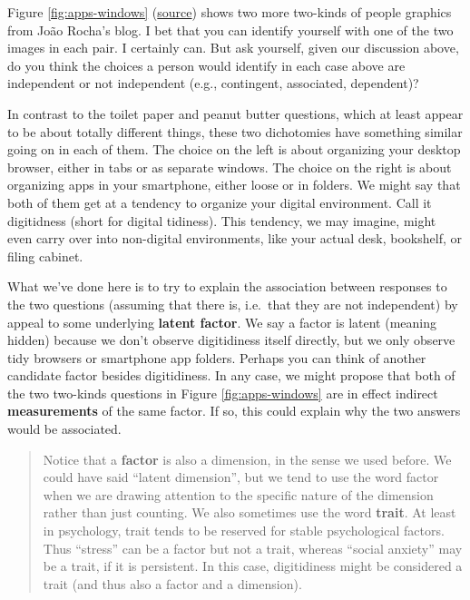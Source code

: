 \documentclass[
  openany]{book}
\begin{document}
Figure \ref{fig:apps-windows} (\href{https://2kindsofpeople.tumblr.com/}{source}) shows two more two-kinds of people graphics from João Rocha's blog. I bet that you can identify yourself with one of the two images in each pair. I certainly can. But ask yourself, given our discussion above, do you think the choices a person would identify in each case above are independent or not independent (e.g., contingent, associated, dependent)?

In contrast to the toilet paper and peanut butter questions, which at least appear to be about totally different things, these two dichotomies have something similar going on in each of them. The choice on the left is about organizing your desktop browser, either in tabs or as separate windows. The choice on the right is about organizing apps in your smartphone, either loose or in folders. We might say that both of them get at a tendency to organize your digital environment. Call it digitidness (short for digital tidiness). This tendency, we may imagine, might even carry over into non-digital environments, like your actual desk, bookshelf, or filing cabinet.

What we've done here is to try to explain the association between responses to the two questions (assuming that there is, i.e.~that they are not independent) by appeal to some underlying \textbf{latent factor}. We say a factor is latent (meaning hidden) because we don't observe digitidiness itself directly, but we only observe tidy browsers or smartphone app folders. Perhaps you can think of another candidate factor besides digitidiness. In any case, we might propose that both of the two two-kinds questions in Figure \ref{fig:apps-windows} are in effect indirect \textbf{measurements} of the same factor. If so, this could explain why the two answers would be associated.

\begin{quote}
Notice that a \textbf{factor} is also a dimension, in the sense we used before. We could have said ``latent dimension'', but we tend to use the word factor when we are drawing attention to the specific nature of the dimension rather than just counting. We also sometimes use the word \textbf{trait}. At least in psychology, trait tends to be reserved for stable psychological factors. Thus ``stress'' can be a factor but not a trait, whereas ``social anxiety'' may be a trait, if it is persistent. In this case, digitidiness might be considered a trait (and thus also a factor and a dimension).
\end{quote}
\end{document}
